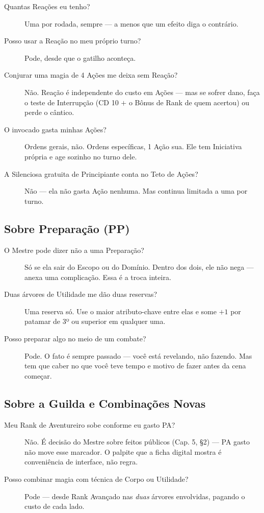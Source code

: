 \begin{description}
    \item[Quantas Reações eu tenho?] Uma por rodada, sempre --- a menos que um efeito diga o
          contrário.
    \item[Posso usar a Reação no meu próprio turno?] Pode, desde que o gatilho aconteça.
    \item[Conjurar uma magia de 4 Ações me deixa sem Reação?] Não. Reação é independente do
          custo em Ações --- mas se sofrer dano, faça o teste de Interrupção (CD 10 $+$ o Bônus
          de Rank de quem acertou) ou perde o cântico.
    \item[O invocado gasta minhas Ações?] Ordens gerais, não. Ordens específicas, 1 Ação sua.
          Ele tem Iniciativa própria e age sozinho no turno dele.
    \item[A Silenciosa gratuita de Principiante conta no Teto de Ações?] Não --- ela não gasta
          Ação nenhuma. Mas continua limitada a uma por turno.
\end{description}

\subsection{Sobre Preparação (PP)}

\begin{description}
    \item[O Mestre pode dizer não a uma Preparação?] Só se ela sair do Escopo ou do Domínio.
          Dentro dos dois, ele não nega --- anexa uma complicação. Essa é a troca inteira.
    \item[Duas árvores de Utilidade me dão duas reservas?] Uma reserva só. Use o maior
          atributo-chave entre elas e some $+1$ por patamar de 3º ou superior em qualquer uma.
    \item[Posso preparar algo no meio de um combate?] Pode. O fato é sempre passado --- você
          está revelando, não fazendo. Mas tem que caber no que você teve tempo e motivo de
          fazer antes da cena começar.
\end{description}

\subsection{Sobre a Guilda e Combinações Novas}

\begin{description}
    \item[Meu Rank de Aventureiro sobe conforme eu gasto PA?] Não. É decisão do Mestre sobre
          feitos públicos (Cap. 5, §2) --- PA gasto não move esse marcador. O palpite que a
          ficha digital mostra é conveniência de interface, não regra.
    \item[Posso combinar magia com técnica de Corpo ou Utilidade?] Pode --- desde Rank Avançado
          nas \emph{duas} árvores envolvidas, pagando o custo de cada lado.
\end{description}

